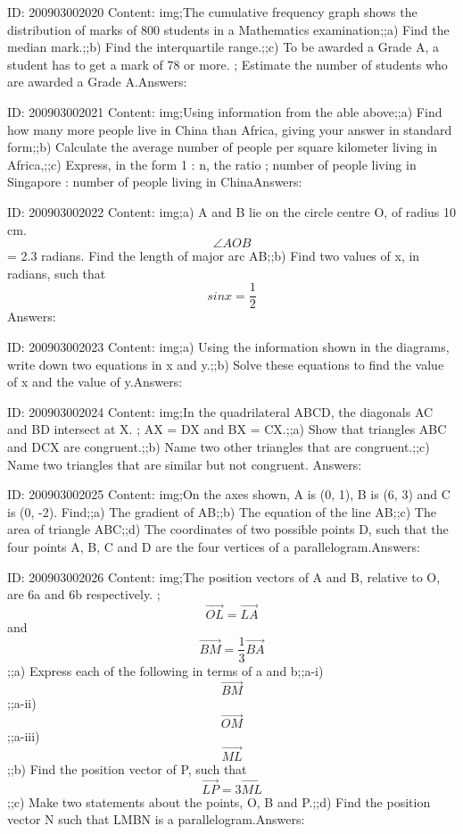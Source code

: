 \documentclass{article}
\begin{document}
ID: 200903002020
Content:
img;The cumulative frequency graph shows the distribution of marks of 800 students in a Mathematics examination;;a) Find the median mark.;;b) Find the interquartile range.;;c) To be awarded a Grade A, a student has to get a mark of 78 or more. ; Estimate the number of students who are awarded a Grade A.Answers:

ID: 200903002021
Content:
img;Using information from the able above;;a) Find how many more people live in China than Africa, giving your answer in standard form;;b) Calculate the average number of people per square kilometer living in Africa,;;c) Express, in the form 1 : n, the ratio ; number of people living in Singapore : number of people living in ChinaAnswers:

ID: 200903002022
Content:
img;a) A and B lie on the circle centre O, of radius 10 cm. $$\angle AOB$$ = 2.3 radians. Find the length of major arc AB;;b) Find two values of x, in radians, such that $$sin x = \frac{1}{2}$$Answers:

ID: 200903002023
Content:
img;a) Using the information shown in the diagrams, write down two equations in x and y.;;b) Solve these equations to find the value of x and the value of y.Answers:

ID: 200903002024
Content:
img;In the quadrilateral ABCD, the diagonals AC and BD intersect at X. ; AX = DX and BX = CX.;;a) Show that triangles ABC and DCX are congruent.;;b) Name two other triangles that are congruent.;;c) Name two triangles that are similar but not congruent. Answers:

ID: 200903002025
Content:
img;On the axes shown, A is (0, 1), B is (6, 3) and C is (0, -2). Find;;a) The gradient of AB;;b) The equation of the line AB;;c) The area of triangle ABC;;d) The coordinates of two possible points D, such that the four points A, B, C and D are the four vertices of a parallelogram.Answers:

ID: 200903002026
Content:
img;The position vectors of A and B, relative to O, are 6a and 6b respectively. ; $$\vec{OL} = \vec{LA}$$ and $$\vec{BM} = \frac{1}{3} \vec{BA}$$;;a) Express each of the following in terms of a and b;;a-i) $$\vec{BM}$$;;a-ii) $$\vec{OM}$$;;a-iii) $$\vec{ML}$$;;b) Find the position vector of P, such that $$ \vec{LP} = 3 \vec{ML}$$;;c) Make two statements about the points, O, B and P.;;d) Find the position vector N such that LMBN is a parallelogram.Answers:
\end{document}
